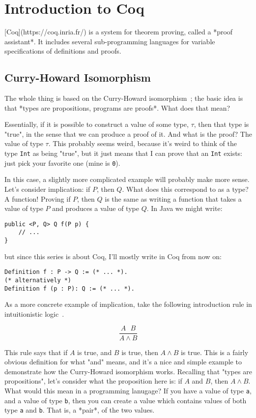 \section{Introduction to Coq}

[Coq](https://coq.inria.fr/) is a system for theorem proving, called a *proof assistant*.
It includes several sub-programming languages for variable specifications of definitions and proofs.

\subsection{Curry-Howard Isomorphism}

The whole thing is based on the Curry-Howard isomorphism~\cite{curry-howard}; the basic idea is that *types are propositions, programs are proofs*.
What does that mean?

Essentially, if it is possible to construct a value of some type, $\tau$, then that type is "true", in the sense that we can produce a proof of it.
And what is the proof?
The value of type $\tau$.
This probably seems weird, because it's weird to think of the type \texttt{Int} as being "true", but it just means that I can prove that an \texttt{Int} exists: just pick your favorite one (mine is \texttt{0}).

In this case, a slightly more complicated example will probably make more sense.
Let's consider implication: if $P$, then $Q$.
What does this correspond to as a type?
A function!
Proving if $P$, then $Q$ is the same as writing a function that takes a value of type $P$ and produces a value of type $Q$.
In Java we might write:

\begin{verbatim}
public <P, Q> Q f(P p) {
    // ...
}
\end{verbatim}

but since this series is about Coq, I'll mostly write in Coq from now on:

\begin{verbatim}
Definition f : P -> Q := (* ... *).
(* alternatively *)
Definition f (p : P): Q := (* ... *).
\end{verbatim}

As a more concrete example of implication, take the following introduction rule in intuitionistic logic~\cite{intuit-logic}.

$$ \frac{A~~~B}{A \wedge B} $$

This rule says that if $A$ is true, and $B$ is true, then $ A \wedge B $ is true.
This is a fairly obvious definition for what "and" means, and it's a nice and simple example to demonstrate how the Curry-Howard isomorphism works.
Recalling that "types are propositions", let's consider what the proposition here is: if $A$ and $B$, then $A \wedge B$.
What would this mean in a programming lanugage?
If you have a value of type \texttt{a}, and a value of type \texttt{b}, then you can create a value which contains values of both type \texttt{a} and \texttt{b}.
That is, a *pair*, of the two values.

